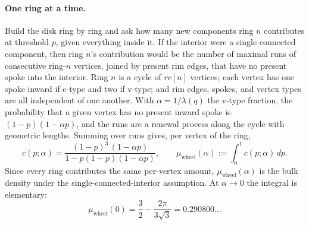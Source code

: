\documentclass[11pt]{article}
\begin{document}
\paragraph{One ring at a time.} Build the disk ring by ring and ask how many new components ring $n$ contributes at threshold $p$, given everything inside it. If the interior were a single connected component, then ring $n$'s contribution would be the number of maximal runs of consecutive ring-$n$ vertices, joined by present rim edges, that have no present spoke into the interior. Ring $n$ is a cycle of $rc[n]$ vertices; each vertex has one spoke inward if e-type and two if v-type; and rim edges, spokes, and vertex types are all independent of one another. With $\alpha=1/\lambda(q)$ the v-type fraction, the probability that a given vertex has no present inward spoke is $(1-p)(1-\alpha p)$, and the runs are a renewal process along the cycle with geometric lengths. Summing over runs gives, per vertex of the ring,
\begin{equation}
c(p;\alpha) = \frac{(1-p)^3\,(1-\alpha p)}{1-p(1-p)(1-\alpha p)},
\qquad
\mu_{\mathrm{wheel}}(\alpha) := \int_0^1 c(p;\alpha)\,dp.
\label{eq:wheel}
\end{equation}
Since every ring contributes the same per-vertex amount, $\mu_{\mathrm{wheel}}(\alpha)$ is the bulk density under the single-connected-interior assumption. At $\alpha\to0$ the integral is elementary:
\begin{equation}
\mu_{\mathrm{wheel}}(0) = \frac32 - \frac{2\pi}{3\sqrt3} = 0.290800\ldots
\label{eq:intercept}
\end{equation}
\end{document}
